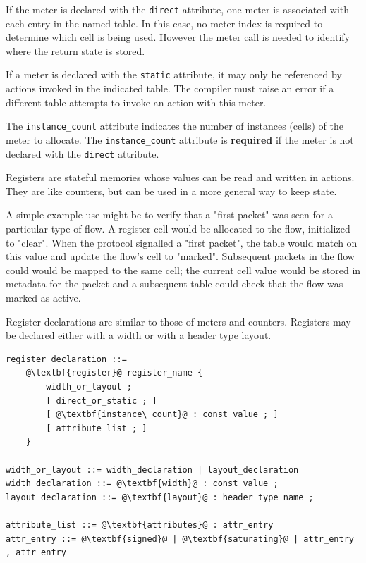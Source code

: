 \documentclass[12pt]{article}
\begin{document}
If the meter is declared with the \texttt{direct} attribute, one meter
is associated with each entry in the named table. In this case, no
meter index is required to determine which cell is being used. However
the meter call is needed to identify where the return state is stored.

If a meter is declared with the \texttt{static} attribute, it may only
be referenced by actions invoked in the indicated table. The compiler
must raise an error if a different table attempts to invoke an action
with this meter.

The \texttt{instance_count} attribute indicates the number of
instances (cells) of the meter to allocate.  The
\texttt{instance_count} attribute is \textbf{required} if the meter
is not declared with the \texttt{direct} attribute.


Registers are stateful memories whose values can be read and written
in actions.  They are like counters, but can be used in a more general
way to keep state.

A simple example use might be to verify that a "first packet" was seen
for a particular type of flow. A register cell would be allocated to
the flow, initialized to "clear". When the protocol signalled a "first
packet", the table would match on this value and update the flow's
cell to "marked".  Subsequent packets in the flow could would be
mapped to the same cell; the current cell value would be stored in
metadata for the packet and a subsequent table could check that the
flow was marked as active.

Register declarations are similar to those of meters and
counters. Registers may be declared either with a width or with a
header type layout.

\begin{lstlisting}[frame=single,backgroundcolor=\color{bnfgreen},escapechar=\@]
register_declaration ::= 
    @\textbf{register}@ register_name {
        width_or_layout ;
        [ direct_or_static ; ]
        [ @\textbf{instance\_count}@ : const_value ; ]
        [ attribute_list ; ]
    }

width_or_layout ::= width_declaration | layout_declaration
width_declaration ::= @\textbf{width}@ : const_value ;
layout_declaration ::= @\textbf{layout}@ : header_type_name ;

attribute_list ::= @\textbf{attributes}@ : attr_entry
attr_entry ::= @\textbf{signed}@ | @\textbf{saturating}@ | attr_entry , attr_entry
\end{lstlisting}
\end{document}
